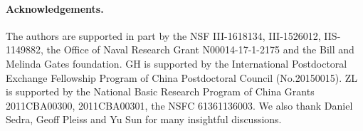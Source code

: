 \documentclass[10pt,twocolumn,letterpaper]{article}
\begin{document}

\maketitle

\begin{abstract}

\end{abstract}














\vspace{-3pt}
\paragraph{Acknowledgements.} The authors are supported in part by the NSF III-1618134, III-1526012, IIS-1149882, the Office of Naval Research Grant N00014-17-1-2175 and the Bill and Melinda Gates foundation. GH is supported by the International Postdoctoral Exchange Fellowship Program of China Postdoctoral Council (No.20150015). ZL is supported by the National Basic Research Program of China Grants 2011CBA00300, 2011CBA00301, the NSFC 61361136003. We also thank Daniel Sedra, Geoff Pleiss and Yu Sun
for many insightful discussions.

{\small

}
\end{document}
